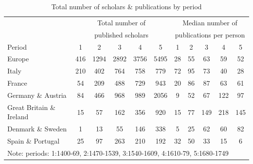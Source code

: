 \begin{table}[!htbp]
\centering
		\begin{tabular}{@{ \extracolsep{3pt}}lcccccccccc}%
\toprule
			& \multicolumn{5}{c}{Total number of }  & \multicolumn{5}{c}{Median number of }\\
			& \multicolumn{5}{c}{published scholars}  & \multicolumn{5}{c}{ publications per person}\\
			Period   & 1 &2 & 3 & 4 & 5  & 1 &2 & 3 & 4 & 5\\
\midrule
Europe                   & 416      & 1294     & 2892     & 3756     & 5495     & 28       & 55       & 63       & 59       & 52 \\
Italy                    & 210      & 402      & 764      & 758      & 779      & 72       & 95       & 73       & 40       & 28 \\
France                   & 54       & 209      & 488      & 729      & 943      & 20       & 86       & 87       & 63       & 61 \\
Germany \& Austria       & 84       & 466      & 968      & 989      & 2056     & 9        & 52       & 67       & 122      & 97 \\
Great Britain \& Ireland & 15       & 57       & 162      & 356      & 920      & 15       & 77       & 149      & 218      & 145 \\
Denmark \& Sweden        & 1        & 13       & 55       & 146      & 338      & 5        & 25       & 62       & 60       & 82 \\
Spain \& Portugal        & 25       & 97       & 263      & 210      & 192      & 32       & 50       & 33       & 15       & 6 \\
\bottomrule
			\multicolumn{11}{l}{\footnotesize Note: periods: 1:1400-69, 2:1470-1539, 3:1540-1609, 4:1610-79, 5:1680-1749}
	\end{tabular}
	\caption{Total number of scholars \& publications by period}\label{tab:publi}
\end{table}


